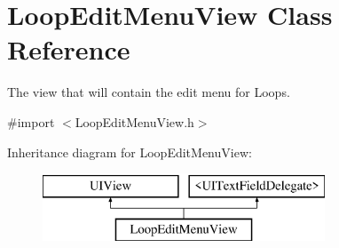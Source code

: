 \hypertarget{interface_loop_edit_menu_view}{\section{Loop\-Edit\-Menu\-View Class Reference}
\label{interface_loop_edit_menu_view}
}


The view that will contain the edit menu for Loops.  




{\ttfamily \#import $<$Loop\-Edit\-Menu\-View.\-h$>$}

Inheritance diagram for Loop\-Edit\-Menu\-View\-:\begin{figure}[H]
\begin{center}
\leavevmode
\includegraphics[height=2.000000cm]{interface_loop_edit_menu_view}
\end{center}
\end{figure}
